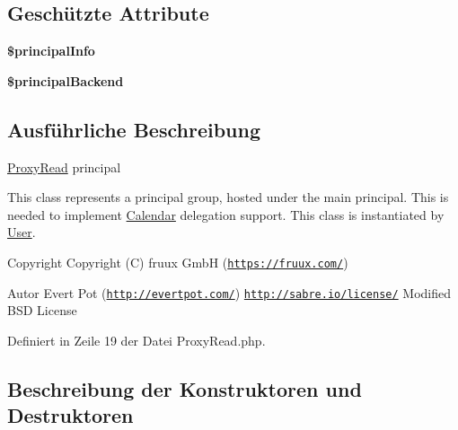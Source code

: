 \subsection*{Geschützte Attribute}
\begin{DoxyCompactItemize}
\item 
\mbox{\label{class_sabre_1_1_cal_d_a_v_1_1_principal_1_1_proxy_read_a8f4e4d07b6c1f627a91dc322cc98e75d}} 
{\bfseries \$principal\+Info}
\item 
\mbox{\label{class_sabre_1_1_cal_d_a_v_1_1_principal_1_1_proxy_read_ae0298fb168229c04f8f25c5a93b1bc22}} 
{\bfseries \$principal\+Backend}
\end{DoxyCompactItemize}


\subsection{Ausführliche Beschreibung}
\mbox{\hyperlink{class_sabre_1_1_cal_d_a_v_1_1_principal_1_1_proxy_read}{Proxy\+Read}} principal

This class represents a principal group, hosted under the main principal. This is needed to implement \textquotesingle{}\mbox{\hyperlink{class_sabre_1_1_cal_d_a_v_1_1_calendar}{Calendar}} delegation\textquotesingle{} support. This class is instantiated by \mbox{\hyperlink{class_sabre_1_1_cal_d_a_v_1_1_principal_1_1_user}{User}}.

\begin{DoxyCopyright}{Copyright}
Copyright (C) fruux GmbH (\href{https://fruux.com/}{\tt https\+://fruux.\+com/}) 
\end{DoxyCopyright}
\begin{DoxyAuthor}{Autor}
Evert Pot (\href{http://evertpot.com/}{\tt http\+://evertpot.\+com/})  \href{http://sabre.io/license/}{\tt http\+://sabre.\+io/license/} Modified B\+SD License 
\end{DoxyAuthor}


Definiert in Zeile 19 der Datei Proxy\+Read.\+php.



\subsection{Beschreibung der Konstruktoren und Destruktoren}
\mbox{\label{class_sabre_1_1_cal_d_a_v_1_1_principal_1_1_proxy_read_adb01be675e14eb27e0b57a1270d22268}} 

